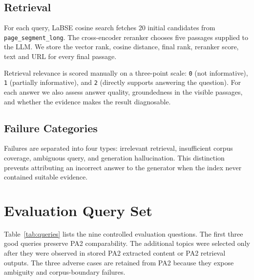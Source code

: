 \documentclass[9pt]{IEEEtran}
\begin{document}
\subsection{Retrieval}
For each query, LaBSE cosine search fetches 20 initial candidates from
\texttt{page\_segment\_long}.  The cross-encoder reranker chooses five
passages supplied to the LLM.  We store the vector rank, cosine distance,
final rank, reranker score, text and URL for every final passage.

Retrieval relevance is scored manually on a three-point scale:
\texttt{0} (not informative), \texttt{1} (partially informative), and
\texttt{2} (directly supports answering the question).  For each answer we
also assess answer quality, groundedness in the visible passages, and whether
the evidence makes the result diagnosable.

\subsection{Failure Categories}
Failures are separated into four types: irrelevant retrieval, insufficient
corpus coverage, ambiguous query, and generation hallucination.  This
distinction prevents attributing an incorrect answer to the generator when
the index never contained suitable evidence.

\section{Evaluation Query Set}
Table~\ref{tab:queries} lists the nine controlled evaluation questions.  The
first three good queries preserve PA2 comparability.  The additional topics
were selected only after they were observed in stored PA2 extracted content
or PA2 retrieval outputs.  The three adverse cases are retained from PA2
because they expose ambiguity and corpus-boundary failures.
\end{document}
